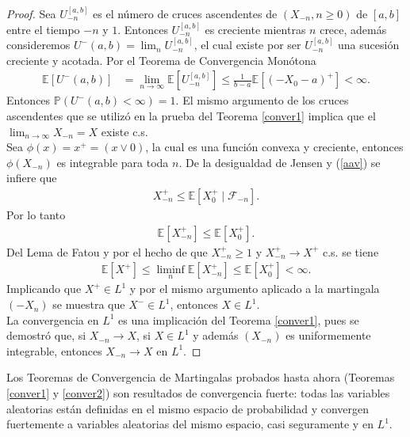 \begin{proof}
Sea $U_{-n}^{[a, b]}$ es el número de cruces ascendentes de $(X_{-n}, n \geq 0)$ de $[a, b]$ entre el tiempo $-n$ y $1$. Entonces $U_{-n}^{[a, b]}$ es creciente mientras $n$ crece, además consideremos $U^{-}(a, b) = \lim_n U_{-n}^{[a, b]}$, el cual existe por ser $U_{-n}^{[a, b]}$ una sucesión creciente y acotada. Por el Teorema de Convergencia Monótona
	\begin{align*}
	\mathbb{E}[U^{-}(a, b)] & = \lim_{n \rightarrow \infty} \mathbb{E}[U_{-n}^{[a, b]}] \leq \frac{1}{b-a} \mathbb{E}[(-X_0 - a)^{+}] < \infty.
	\end{align*}
Entonces $\mathbb{P}(U^{-}(a, b) < \infty) = 1$. El mismo argumento de los cruces ascendentes que se utilizó en la prueba del Teorema \ref{conver1} implica que el $\lim_{n \rightarrow \infty} X_{-n} = X$ existe c.s. \\

Sea $\phi(x) = x^{+} = (x \vee 0)$, la cual es una función convexa y creciente, entonces $\phi(X_{-n})$ es integrable para toda $n$. De la desigualdad de Jensen y (\ref{aav}) se infiere que 
	\begin{align*}
	X_{-n}^{+} \leq \mathbb{E}[X_0^{+} \mid \mathcal{F}_{-n}].
	\end{align*}
Por lo tanto
	\begin{align*}
	\mathbb{E}[X_{-n}^{+}] \leq \mathbb{E}[X_0^{+}].
	\end{align*}
Del Lema de Fatou y por el hecho de que $X_{-n}^{+} \geq 1$ y $X_{-n}^{+} \rightarrow X^{+}$ c.s. se tiene
	\begin{align*}
	\mathbb{E}[X^{+}] \leq \liminf_n \mathbb{E}[X_{-n}^{+}] \leq \mathbb{E}[X_0^{+}] < \infty.
	\end{align*}
Implicando que $X^{+} \in L^1$ y por el mismo argumento aplicado a la martingala $(-X_n)$ se muestra que $X^{-} \in L^1$, entonces $X \in L^1$. \\

La convergencia en $L^1$ es una implicación del Teorema \ref{conver1}, pues se demostró que, si $X_{-n} \rightarrow X$, si $X \in L^1$ y además $(X_{-n})$ es uniformemente integrable, entonces $X_{-n} \rightarrow X$ en $L^1$.
\end{proof}

Los Teoremas de Convergencia de Martingalas probados hasta ahora (Teoremas \ref{conver1} y \ref{conver2}) son resultados de convergencia fuerte: todas las variables aleatorias están definidas en el mismo espacio de probabilidad y convergen fuertemente a variables aleatorias del mismo espacio, casi seguramente y en $L^1$. \\ 

